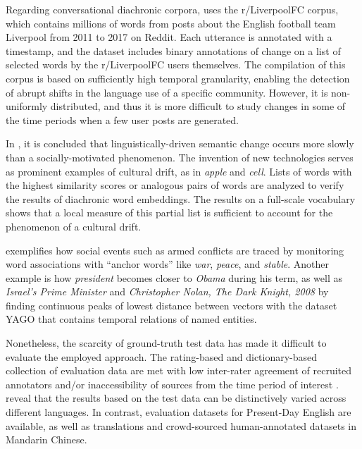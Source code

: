 Regarding conversational diachronic corpora, \textcite{giulianelli2019lexical} uses the r/LiverpoolFC corpus, which contains millions of words from posts about the English football team Liverpool from 2011 to 2017 on Reddit. Each utterance is annotated with a timestamp, and the dataset includes binary annotations of change on a list of selected words by the r/LiverpoolFC users themselves. The compilation of this corpus is based on sufficiently high temporal granularity, enabling the detection of abrupt shifts in the language use of a specific community. However, it is non-uniformly distributed, and thus it is more difficult to study changes in some of the time periods when a few user posts are generated.

In \textcite{hamilton2016cultural}, it is concluded that linguistically-driven semantic change occurs more slowly than a socially-motivated phenomenon. The invention of new technologies serves as prominent examples of cultural drift, as in \textit{apple} and \textit{cell}. Lists of words with the highest similarity scores or analogous pairs of words are analyzed to verify the results of diachronic word embeddings. The results on a full-scale vocabulary shows that a local measure of this partial list is sufficient to account for the phenomenon of a cultural drift.

\textcite{kutuzov2017tracing} exemplifies how social events such as armed conflicts are traced by monitoring word associations with ``anchor words'' like \textit{war}, \textit{peace}, and \textit{stable}. Another example is how \textit{president} becomes closer to \textit{Obama} during his term, as well as \textit{Israel's Prime Minister} and \textit{Christopher Nolan, The Dark Knight, 2008} \parencite{rosin2017learning} by finding continuous peaks of lowest distance between vectors with the dataset YAGO that contains temporal relations of named entities.

Nonetheless, the scarcity of ground-truth test data has made it difficult to evaluate the employed approach. The rating-based and dictionary-based collection of evaluation data are met with low inter-rater agreement of recruited annotators and/or inaccessibility of sources from the time period of interest \parencite{tang2018state}. \textcite{kutuzov2020uio} reveal that the results based on the test data can be distinctively varied across different languages. In contrast, evaluation datasets for Present-Day English are available, as well as translations and crowd-sourced human-annotated datasets in Mandarin Chinese.

